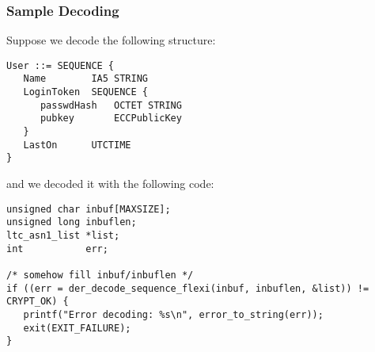 \documentclass[synpaper]{book}
\begin{document}
\subsubsection{Sample Decoding}
Suppose we decode the following structure:
\begin{small}
\begin{verbatim}
User ::= SEQUENCE {
   Name        IA5 STRING
   LoginToken  SEQUENCE {
      passwdHash   OCTET STRING
      pubkey       ECCPublicKey
   }
   LastOn      UTCTIME
}
\end{verbatim}
\end{small}
\begin{flushleft}and we decoded it with the following code:\end{flushleft}

\begin{small}
\begin{verbatim}
unsigned char inbuf[MAXSIZE];
unsigned long inbuflen;
ltc_asn1_list *list;
int           err;

/* somehow fill inbuf/inbuflen */
if ((err = der_decode_sequence_flexi(inbuf, inbuflen, &list)) != CRYPT_OK) {
   printf("Error decoding: %s\n", error_to_string(err));
   exit(EXIT_FAILURE);
}
\end{verbatim}
\end{small}
\end{document}
